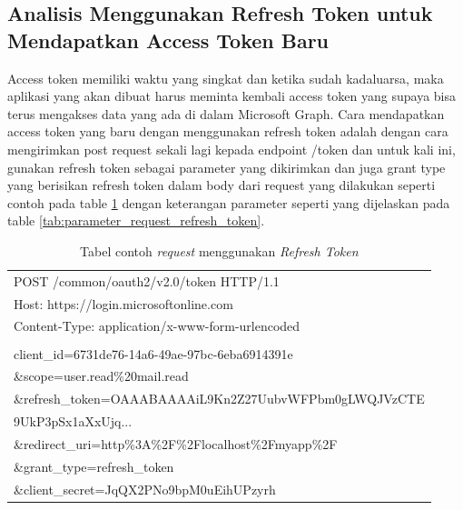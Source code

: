 \subsection{Analisis Menggunakan Refresh Token untuk Mendapatkan Access Token Baru}
\label{analisis_menggunakan_refresh_token}
Access token memiliki waktu yang singkat dan ketika sudah kadaluarsa, maka aplikasi yang akan dibuat harus meminta kembali access token yang supaya bisa terus mengakses data yang ada di dalam Microsoft Graph. Cara mendapatkan access token yang baru dengan menggunakan refresh token adalah dengan cara mengirimkan post request sekali lagi kepada endpoint /token dan untuk kali ini, gunakan refresh token sebagai parameter yang dikirimkan dan juga grant type yang berisikan refresh token dalam body dari request yang dilakukan seperti contoh pada table \ref{tab:contoh_request_refresh_token} dengan keterangan parameter seperti yang dijelaskan pada table \ref{tab:parameter_request_refresh_token}. 

\begin{table}[H]
	\centering 
	\caption{Tabel contoh \textit{request} menggunakan \textit{Refresh Token}}
	\label{tab:contoh_request_refresh_token}
	\begin{tabular}{|p{12cm}|}
	\toprule
	POST /common/oauth2/v2.0/token HTTP/1.1\\
Host: https://login.microsoftonline.com\\
Content-Type: application/x-www-form-urlencoded\\
\\
client\_id=6731de76-14a6-49ae-97bc-6eba6914391e\\
\&scope=user.read\%20mail.read\\
\&refresh\_token=OAAABAAAAiL9Kn2Z27UubvWFPbm0gLWQJVzCTE\\
9UkP3pSx1aXxUjq...\\
\&redirect\_uri=http\%3A\%2F\%2Flocalhost\%2Fmyapp\%2F\\
\&grant\_type=refresh\_token\\
\&client\_secret=JqQX2PNo9bpM0uEihUPzyrh\\
	\bottomrule
	\end{tabular}  
\end{table}

